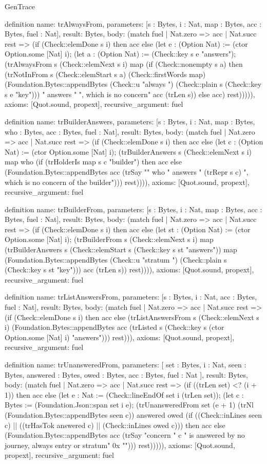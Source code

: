 \begin{lexlean}{GenTrace}
\begin{semanticmodule}
definition{
  name: trAlwaysFrom,
  parameters: [s : Bytes, i : Nat, map : Bytes, acc : Bytes, fuel : Nat],
  result: Bytes,
  body: (match fuel
    | Nat.zero => acc
    | Nat.succ rest => (if (Check::elemDone s i) then acc else (let e : (Option Nat) := (ctor Option.some [Nat] i); (let a : (Option Nat) := (Check::key s e "answers"); (trAlwaysFrom s (Check::elemNext s i) map (if (Check::nonempty s a) then (trNotInFrom s (Check::elemStart s a) (Check::firstWords map) (Foundation.Bytes::appendBytes (Check::u "always ") (Check::plain s (Check::key s e "key"))) " answers " ", which is no concern" acc (trLen s)) else acc) rest))))),
  axioms: [Quot.sound, propext],
  recursive_argument: fuel
}

definition{
  name: trBuilderAnswers,
  parameters: [s : Bytes, i : Nat, map : Bytes, who : Bytes, acc : Bytes, fuel : Nat],
  result: Bytes,
  body: (match fuel
    | Nat.zero => acc
    | Nat.succ rest => (if (Check::elemDone s i) then acc else (let c : (Option Nat) := (ctor Option.some [Nat] i); (trBuilderAnswers s (Check::elemNext s i) map who (if (trHolderIs map s c "builder") then acc else (Foundation.Bytes::appendBytes acc (trSay "" who " answers " (trRepr s c) ", which is no concern of the builder"))) rest)))),
  axioms: [Quot.sound, propext],
  recursive_argument: fuel
}

definition{
  name: trBuilderFrom,
  parameters: [s : Bytes, i : Nat, map : Bytes, acc : Bytes, fuel : Nat],
  result: Bytes,
  body: (match fuel
    | Nat.zero => acc
    | Nat.succ rest => (if (Check::elemDone s i) then acc else (let st : (Option Nat) := (ctor Option.some [Nat] i); (trBuilderFrom s (Check::elemNext s i) map (trBuilderAnswers s (Check::elemStart s (Check::key s st "answers")) map (Foundation.Bytes::appendBytes (Check::u "stratum ") (Check::plain s (Check::key s st "key"))) acc (trLen s)) rest)))),
  axioms: [Quot.sound, propext],
  recursive_argument: fuel
}

definition{
  name: trListAnswersFrom,
  parameters: [s : Bytes, i : Nat, acc : Bytes, fuel : Nat],
  result: Bytes,
  body: (match fuel
    | Nat.zero => acc
    | Nat.succ rest => (if (Check::elemDone s i) then acc else (trListAnswersFrom s (Check::elemNext s i) (Foundation.Bytes::appendBytes acc (trListed s (Check::key s (ctor Option.some [Nat] i) "answers"))) rest))),
  axioms: [Quot.sound, propext],
  recursive_argument: fuel
}

definition{
  name: trUnansweredFrom,
  parameters: [
    set : Bytes,
    i : Nat,
    seen : Bytes,
    answered : Bytes,
    owed : Bytes,
    acc : Bytes,
    fuel : Nat
  ],
  result: Bytes,
  body: (match fuel
    | Nat.zero => acc
    | Nat.succ rest => (if ((trLen set) <? (i + 1)) then acc else (let e : Nat := (Check::lineEndOf set i (trLen set)); (let c : Bytes := (Foundation.Json::span set i e); (trUnansweredFrom set (e + 1) (trNl (Foundation.Bytes::appendBytes seen c)) answered owed (if ((Check::inLines seen c) || ((trHasTok answered c) || (Check::inLines owed c))) then acc else (Foundation.Bytes::appendBytes acc (trSay "concern " c " is answered by no journey, always entry or stratum" 0x ""))) rest))))),
  axioms: [Quot.sound, propext],
  recursive_argument: fuel
}


\end{semanticmodule}
\end{lexlean}
